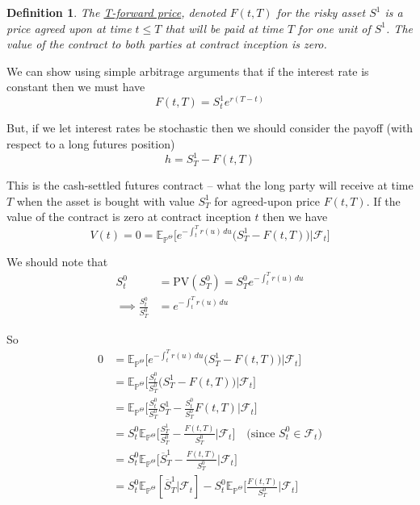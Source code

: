 \documentclass[12pt]{article}
\newtheorem{definition}{Definition}
\newlength\tindent
\renewcommand{\indent}{\hspace*{\tindent}}
\begin{document}
\begin{definition} The \underline{T-forward price}, denoted $F(t,T)$ for the risky asset $S^1$ is a price agreed upon at time $t \leq T$ that will be paid at time $T$ for one unit of $S^1$. The value of the contract to both parties at contract inception is zero.
\end{definition}

\indent We can show using simple arbitrage arguments that if the interest rate is constant then we must have
\begin{equation*}
	F(t,T) = S^1_te^{r(T - t)}
\end{equation*}

\indent But, if we let interest rates be stochastic then we should consider the payoff (with respect to a long futures position)
\begin{equation*}
	h = S^1_T - F(t,T)
\end{equation*}

\indent This is the cash-settled futures contract -- what the long party will receive at time $T$ when the asset is bought with value $S^1_T$ for agreed-upon price $F(t,T)$. If the value of the contract is zero at contract inception $t$ then we have
\begin{equation*}
	V(t) = 0 = \mathbb E_{\mathbb P^\Theta}\big[ e^{-\int^T_t r(u)\,du}\big(S^1_T - F(t,T)\big) \big|\mathcal F_t\big]
\end{equation*}

We should note that
\begin{align*}
	S^0_t &= \mathrm{PV}(S^0_T) = S^0_Te^{-\int^T_t r(u)\,du} \\
	\implies \frac{S^0_t}{S^0_T} &= e^{-\int^T_t r(u)\,du}
\end{align*}

So
\begin{align*}
	0 &= \mathbb E_{\mathbb P^\Theta}\big[ e^{-\int^T_t r(u)\,du}\big(S^1_T - F(t,T)\big) \big|\mathcal F_t\big] \\
	&= \mathbb E_{\mathbb P^\Theta}\bigg[\frac{S^0_t}{S^0_T}\big(S^1_T - F(t,T)\big) \Big| \mathcal F_t\bigg] \\
	&= \mathbb E_{\mathbb P^\Theta}\bigg[\frac{S^0_t}{S^0_T} S^1_T - \frac{S^0_t}{S^0_T} F(t,T) \Big| \mathcal F_t\bigg] \\
	&= S^0_t\mathbb E_{\mathbb P^\Theta}\bigg[\frac{S^1_T}{S^0_T} - \frac{F(t,T)}{S^0_T} \Big| \mathcal F_t\bigg] \quad \text{(since } S^0_t \in \mathcal F_t)  \\
	&= S^0_t\mathbb E_{\mathbb P^\Theta}\bigg[\overline{S}^1_T - \frac{F(t,T)}{S^0_T}\Big| \mathcal F_t\bigg] \\
	&= S^0_t\mathbb E_{\mathbb P^\Theta}[\overline{S}^1_T | \mathcal F_t] - S^0_t\mathbb E_{\mathbb P^\Theta}\bigg[\frac{F(t,T)}{S^0_T} \Big| \mathcal F_t\bigg]
\end{align*}
\end{document}
